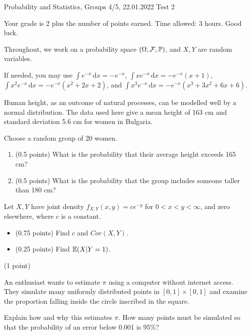 \documentclass[a4paper]{report}
\begin{document}
\noindent Probability and Statistics, Groups 4/5, 22.01.2022 \hfill Test 2

\hrulefill

\begin{it}
Your grade is 2 plus the number of points earned. Time allowed: 3 hours. Good luck.

Throughout, we work on a probability space $(\Omega,{\mathcal{F}},\mathbb P)$, and
$X,Y$ are random variables.

If needed, you may use
$\int e^{-x}\,\mathrm dx=-e^{-x}$, $\int xe^{-x}\,\mathrm dx=-e^{-x}(x+1)$, $\int x^2e^{-x}\,\mathrm dx=-e^{-x}(x^2+2x+2)$,
and $\int x^3e^{-x}\,\mathrm dx=-e^{-x}(x^3+3x^2+6x+6)$.

\end{it}

\begin{problem}
Human height, as an outcome of natural processes, can be modelled well by
a normal distribution. The data used here give a mean height of 163 cm and standard deviation 5.6 cm for women in Bulgaria.

Choose a random group of 20 women.
\begin{enumerate}
    \item (0.5 points) What is the probability that their average height exceeds 165 cm?
    \item (0.5 points) What is the probability that the group includes someone taller than 180 cm?
\end{enumerate}

\end{problem}


\begin{problem}
Let $X,Y$ have joint density $f_{X,Y}(x,y)=ce^{-y}$ for $0<x<y<\infty$, and zero elsewhere, where $c$ is
a constant.

\begin{itemize}
    \item (0.75 points) Find $c$ and $Cor(X,Y)$.
\item (0.25 points) Find $\mathbb {E}(X|Y=1)$.

\end{itemize}


\end{problem}


\begin{problem} (1 point)

An enthusiast wants to estimate $\pi$ using a computer without internet access. They simulate many uniformly distributed points in $[0,1]\times[0,1]$ and examine the
proportion falling inside the circle inscribed in the square.

Explain how and why this estimates $\pi$. How many points must
be simulated so that the probability of an error below 0.001 is 95\%?
\end{problem}
\end{document}
